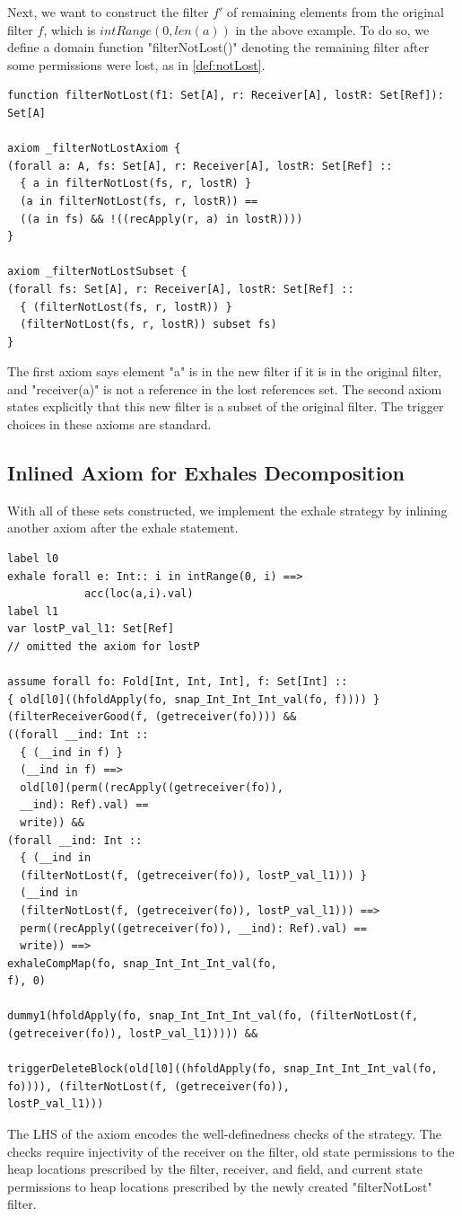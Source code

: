 \documentclass[msc,oneside]{ubcthesis}
\theoremstyle{definition}
\begin{document}
Next, we want to construct the filter $f'$ of remaining elements from the original filter $f$, which is  $intRange(0, len(a))$ in the above example. To do so, we define a domain function "filterNotLost()" denoting the remaining filter after some permissions were lost, as in \cref{def:notLost}.
\begin{lstlisting}[label=axmNotLost, caption=Encoding Filter Remaining after Exhale]
function filterNotLost(f1: Set[A], r: Receiver[A], lostR: Set[Ref]): Set[A] 

axiom _filterNotLostAxiom {
(forall a: A, fs: Set[A], r: Receiver[A], lostR: Set[Ref] ::
  { a in filterNotLost(fs, r, lostR) }
  (a in filterNotLost(fs, r, lostR)) ==
  ((a in fs) && !((recApply(r, a) in lostR))))
}

axiom _filterNotLostSubset {
(forall fs: Set[A], r: Receiver[A], lostR: Set[Ref] ::
  { (filterNotLost(fs, r, lostR)) }
  (filterNotLost(fs, r, lostR)) subset fs)
}
\end{lstlisting}
The first axiom says element "a" is in the new filter if it is in the original filter, and "receiver(a)" is not a reference in the lost references set. The second axiom states explicitly that this new filter is a subset of the original filter. The trigger choices in these axioms are standard.

\subsection{Inlined Axiom for Exhales Decomposition}
With all of these sets constructed, we implement the exhale strategy by inlining another axiom after the exhale statement.
\begin{lstlisting}[label=strat:Exh, caption= Exhale Decomposition Axiom]
label l0
exhale forall e: Int:: i in intRange(0, i) ==> 
            acc(loc(a,i).val)
label l1
var lostP_val_l1: Set[Ref]
// omitted the axiom for lostP

assume forall fo: Fold[Int, Int, Int], f: Set[Int] ::
{ old[l0]((hfoldApply(fo, snap_Int_Int_Int_val(fo, f)))) }
(filterReceiverGood(f, (getreceiver(fo)))) &&
((forall __ind: Int ::
  { (__ind in f) }
  (__ind in f) ==>
  old[l0](perm((recApply((getreceiver(fo)),
  __ind): Ref).val) ==
  write)) &&
(forall __ind: Int ::
  { (__ind in
  (filterNotLost(f, (getreceiver(fo)), lostP_val_l1))) }
  (__ind in
  (filterNotLost(f, (getreceiver(fo)), lostP_val_l1))) ==>
  perm((recApply((getreceiver(fo)), __ind): Ref).val) ==
  write)) ==>
exhaleCompMap(fo, snap_Int_Int_Int_val(fo,
f), 0)
  
dummy1(hfoldApply(fo, snap_Int_Int_Int_val(fo, (filterNotLost(f,
(getreceiver(fo)), lostP_val_l1))))) &&
  
triggerDeleteBlock(old[l0]((hfoldApply(fo, snap_Int_Int_Int_val(fo,
fo)))), (filterNotLost(f, (getreceiver(fo)),
lostP_val_l1))) 
\end{lstlisting}
The LHS of the axiom encodes the well-definedness checks of the strategy. The checks require injectivity of the receiver on the filter, old state permissions to the heap locations prescribed by the filter, receiver, and field, and current state permissions to heap locations prescribed by the newly created "filterNotLost" filter.
\end{document}
